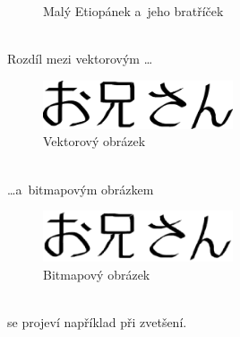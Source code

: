 \documentclass[a4paper, 11pt]{article}
\begin{document}
\begin{figure}[h]
{
}
\caption{Malý Etiopánek a~jeho bratříček}
\label{fig:img1}
\end{figure}\\

Rozdíl mezi vektorovým \dots
\begin{figure}[h]
\centering
\includegraphics[width=0.5\textwidth]{oniisan.eps}
\caption{Vektorový obrázek}
\label{fig:img2}
\end{figure}\\
\dots a~bitmapovým obrázkem
\begin{figure}[h]
\centering
\includegraphics[width=0.5\textwidth]{oniisan2.eps}
\caption{Bitmapový obrázek}
\label{fig:img3}
\end{figure}\\
se projeví například při zvetšení.
\end{document}
